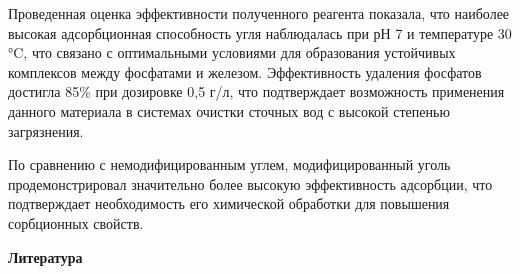 \begin{multicols}{2}
Проведенная оценка эффективности полученного реагента показала, что
наиболее высокая адсорбционная способность угля наблюдалась при рН 7 и
температуре 30 °C, что связано с оптимальными условиями для образования
устойчивых комплексов между фосфатами и железом. Эффективность удаления
фосфатов достигла 85\% при дозировке 0,5 г/л, что подтверждает
возможность применения данного материала в системах очистки сточных вод
с высокой степенью загрязнения.

По сравнению с немодифицированным углем, модифицированный уголь
продемонстрировал значительно более высокую эффективность адсорбции, что
подтверждает необходимость его химической обработки для повышения
сорбционных свойств.
\end{multicols}

\begin{center}
{\bfseries Литература}
\end{center}

